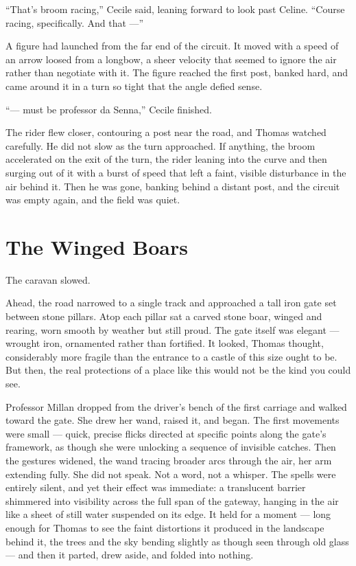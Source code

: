\enquote{That's broom racing,} Cecile said, leaning forward to look past Celine. \enquote{Course racing, specifically. And that ---}
 
A figure had launched from the far end of the circuit. It moved with a speed of an arrow loosed from a longbow, a sheer velocity that seemed to ignore the air rather than negotiate with it. The figure reached the first post, banked hard, and came around it in a turn so tight that the angle defied sense.
 
 
\enquote{--- must be professor da Senna,} Cecile finished.
 
The rider flew closer, contouring a post near the road, and Thomas watched carefully. He did not slow as the turn approached. If anything, the broom accelerated on the exit of the turn, the rider leaning into the curve and then surging out of it with a burst of speed that left a faint, visible disturbance in the air behind it. Then he was gone, banking behind a distant post, and the circuit was empty again, and the field was quiet.
 
\section*{The Winged Boars}
 
The caravan slowed.
 
Ahead, the road narrowed to a single track and approached a tall iron gate set between stone pillars. Atop each pillar sat a carved stone boar, winged and rearing, worn smooth by weather but still proud. The gate itself was elegant --- wrought iron, ornamented rather than fortified. It looked, Thomas thought, considerably more fragile than the entrance to a castle of this size ought to be. But then, the real protections of a place like this would not be the kind you could see.
 
Professor Millan dropped from the driver's bench of the first carriage and walked toward the gate. She drew her wand, raised it, and began. The first movements were small --- quick, precise flicks directed at specific points along the gate's framework, as though she were unlocking a sequence of invisible catches. Then the gestures widened, the wand tracing broader arcs through the air, her arm extending fully. She did not speak. Not a word, not a whisper. The spells were entirely silent, and yet their effect was immediate: a translucent barrier shimmered into visibility across the full span of the gateway, hanging in the air like a sheet of still water suspended on its edge. It held for a moment --- long enough for Thomas to see the faint distortions it produced in the landscape behind it, the trees and the sky bending slightly as though seen through old glass --- and then it parted, drew aside, and folded into nothing.
 
